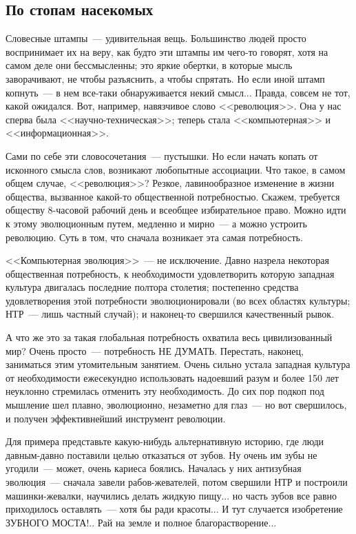\documentclass{scrbook}
\newcommand{\flqq}{<<}
\newcommand{\frqq}{>>}
\newcommand{\mdash}{~--- }
\newcommand{\essaysection}[1]{\subsection*{#1}\nopagebreak}
\begin{document}
\essaysection{По стопам насекомых}

Словесные штампы{\mdash}удивительная вещь. Большинство людей просто воспринимает их на веру, как будто эти штампы им чего-то говорят, хотя на самом деле они бессмысленны; это яркие обертки, в которые мысль заворачивают, не чтобы разъяснить, а чтобы спрятать. Но если иной штамп копнуть{\mdash}в нем все-таки обнаруживается некий смысл... Правда, совсем не тот, какой ожидался. Вот, например, навязчивое слово {\flqq}революция{\frqq}. Она у нас сперва была {\flqq}научно-техническая{\frqq}; теперь стала {\flqq}компьютерная{\frqq} и {\flqq}информационная{\frqq}.

Сами по себе эти словосочетания{\mdash}пустышки. Но если начать копать от исконного смысла слов, возникают любопытные ассоциации. Что такое, в самом общем случае, {\flqq}революция{\frqq}? Резкое, лавинообразное изменение в жизни общества, вызванное какой-то общественной потребностью. Скажем, требуется обществу 8-часовой рабочий день и всеобщее избирательное право. Можно идти к этому эволюционным путем, медленно и мирно{\mdash}а можно устроить революцию. Суть в том, что сначала возникает эта самая потребность.

{\flqq}Компьютерная эволюция{\frqq}{\mdash}не исключение. Давно назрела некоторая общественная потребность, к необходимости удовлетворить которую западная культура двигалась последние полтора столетия; постепенно средства удовлетворения этой потребности эволюционировали (во всех областях культуры; НТР{\mdash}лишь частный случай); и наконец-то свершился качественный рывок.

А что же это за такая глобальная потребность охватила весь цивилизованный мир? Очень просто{\mdash}потребность НЕ ДУМАТЬ. Перестать, наконец, заниматься этим утомительным занятием. Очень сильно устала западная культура от необходимости ежесекундно использовать надоевший разум и более 150 лет неуклонно стремилась отменить эту необходимость. До сих пор подкоп под мышление шел плавно, эволюционно, незаметно для глаз{\mdash}но вот свершилось, и получен эффективнейший инструмент революции.

Для примера представьте какую-нибудь альтернативную историю, где люди давным-давно поставили целью отказаться от зубов. Ну очень им зубы не угодили{\mdash}может, очень кариеса боялись. Началась у них антизубная эволюция{\mdash}сначала завели рабов-жевателей, потом свершили НТР и построили машинки-жевалки, научились делать жидкую пищу... но часть зубов все равно приходилось оставлять{\mdash}хотя бы ради красоты... И тут случается изобретение ЗУБНОГО МОСТА!.. Рай на земле и полное благорастворение...
\end{document}

